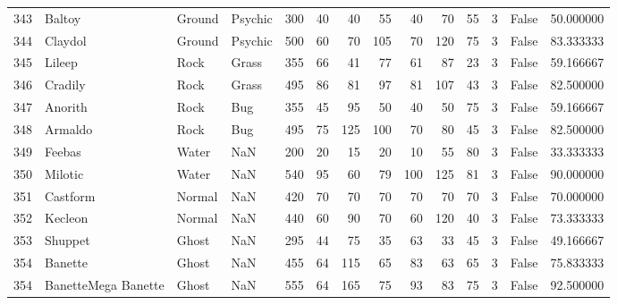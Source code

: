 \begin{tabular}{rlllrrrrrrrrlr}
 343 &                     Baltoy &    Ground &   Psychic &    300 &   40 &      40 &       55 &       40 &       70 &     55 &           3 &      False &   50.000000 \\
 344 &                    Claydol &    Ground &   Psychic &    500 &   60 &      70 &      105 &       70 &      120 &     75 &           3 &      False &   83.333333 \\
 345 &                     Lileep &      Rock &     Grass &    355 &   66 &      41 &       77 &       61 &       87 &     23 &           3 &      False &   59.166667 \\
 346 &                    Cradily &      Rock &     Grass &    495 &   86 &      81 &       97 &       81 &      107 &     43 &           3 &      False &   82.500000 \\
 347 &                    Anorith &      Rock &       Bug &    355 &   45 &      95 &       50 &       40 &       50 &     75 &           3 &      False &   59.166667 \\
 348 &                    Armaldo &      Rock &       Bug &    495 &   75 &     125 &      100 &       70 &       80 &     45 &           3 &      False &   82.500000 \\
 349 &                     Feebas &     Water &       NaN &    200 &   20 &      15 &       20 &       10 &       55 &     80 &           3 &      False &   33.333333 \\
 350 &                    Milotic &     Water &       NaN &    540 &   95 &      60 &       79 &      100 &      125 &     81 &           3 &      False &   90.000000 \\
 351 &                   Castform &    Normal &       NaN &    420 &   70 &      70 &       70 &       70 &       70 &     70 &           3 &      False &   70.000000 \\
 352 &                    Kecleon &    Normal &       NaN &    440 &   60 &      90 &       70 &       60 &      120 &     40 &           3 &      False &   73.333333 \\
 353 &                    Shuppet &     Ghost &       NaN &    295 &   44 &      75 &       35 &       63 &       33 &     45 &           3 &      False &   49.166667 \\
 354 &                    Banette &     Ghost &       NaN &    455 &   64 &     115 &       65 &       83 &       63 &     65 &           3 &      False &   75.833333 \\
 354 &        BanetteMega Banette &     Ghost &       NaN &    555 &   64 &     165 &       75 &       93 &       83 &     75 &           3 &      False &   92.500000 \\

\end{tabular}

